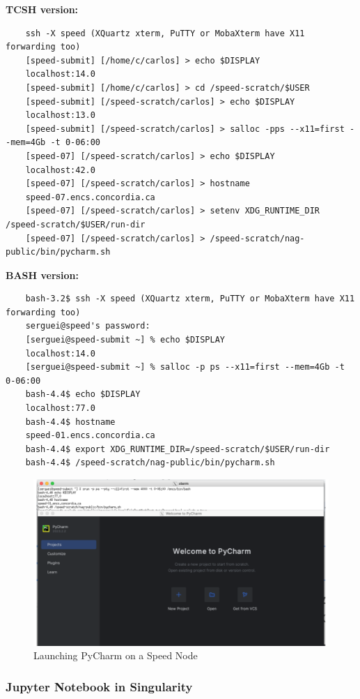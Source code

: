 \small
\noindent \textbf{TCSH version:}
\begin{verbatim}
	ssh -X speed (XQuartz xterm, PuTTY or MobaXterm have X11 forwarding too)
	[speed-submit] [/home/c/carlos] > echo $DISPLAY
	localhost:14.0
	[speed-submit] [/home/c/carlos] > cd /speed-scratch/$USER
	[speed-submit] [/speed-scratch/carlos] > echo $DISPLAY
	localhost:13.0
	[speed-submit] [/speed-scratch/carlos] > salloc -pps --x11=first --mem=4Gb -t 0-06:00
	[speed-07] [/speed-scratch/carlos] > echo $DISPLAY
	localhost:42.0
	[speed-07] [/speed-scratch/carlos] > hostname
	speed-07.encs.concordia.ca
	[speed-07] [/speed-scratch/carlos] > setenv XDG_RUNTIME_DIR /speed-scratch/$USER/run-dir
	[speed-07] [/speed-scratch/carlos] > /speed-scratch/nag-public/bin/pycharm.sh
\end{verbatim}

\noindent \textbf{BASH version:}
\begin{verbatim}
	bash-3.2$ ssh -X speed (XQuartz xterm, PuTTY or MobaXterm have X11 forwarding too)
	serguei@speed's password: 
	[serguei@speed-submit ~] % echo $DISPLAY
	localhost:14.0
	[serguei@speed-submit ~] % salloc -p ps --x11=first --mem=4Gb -t 0-06:00 
	bash-4.4$ echo $DISPLAY
	localhost:77.0
	bash-4.4$ hostname
	speed-01.encs.concordia.ca
	bash-4.4$ export XDG_RUNTIME_DIR=/speed-scratch/$USER/run-dir
	bash-4.4$ /speed-scratch/nag-public/bin/pycharm.sh
	\end{verbatim}
\normalsize

\begin{figure}[htpb]
	\includegraphics[width=\columnwidth]{images/pycharm}
	\caption{Launching PyCharm on a Speed Node}
	\label{fig:pycharm}
\end{figure}

\subsubsection{Jupyter Notebook in Singularity}
\label{sect:jupyter}

